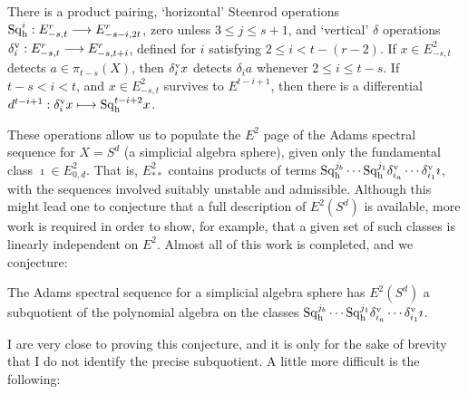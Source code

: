 \documentclass[11pt]{article}
\newcommand{\Sq}{\mathrm{Sq}}
\begin{document}
\begin{thm*}\label{adamsOperationsOmnibus}
There is a product pairing, `horizontal' Steenrod operations $\Sq^i_\textup{h}:E^r_{-s,t}\to E^r_{-s-i,2t}$, zero unless $3\leq j\leq s+1$, and `vertical' $\delta$ operations $\delta_i^\textup{v}:E^r_{-s,t}\to E^r_{-s,t+i}$, defined for $i$ satisfying $2\leq i<t-(r-2)$. If $x\in E^2_{-s,t}$ detects $a\in\pi_{t-s}(X)$, then $\delta_i^\textup{v}x$ detects $\delta_ia$ whenever $2\leq i\leq t-s$. If $t-s<i<t$, and $x\in E^2_{-s,t}$ survives to $E^{t-i+1}$, then there is a differential $d^{t-i+1}:\delta_i^\textup{v}x\mapsto \Sq_\textup{h}^{t-i+2}x$.
\end{thm*}
These operations allow us to populate the $E^2$ page of the Adams spectral sequence for $X=S^d$ (a simplicial algebra sphere), given only the fundamental class $\imath\in E^2_{0,d}$. That is, $E^2_{**}$ contains products of terms $\Sq^{j_b}_\textup{h}\cdots \Sq^{j_1}_\textup{h}\delta_{i_a}^\textup{v}\cdots \delta_{i_1}^\textup{v}\imath$, with the sequences involved suitably unstable and admissible. Although this might lead one to conjecture that a full description of $E^2(S^d)$ is available, more work is required in order to show, for example, that a given set of such classes is linearly independent on $E^2$. Almost all of this work is completed, and we conjecture:
\begin{conjecture}
The Adams spectral sequence for a simplicial algebra sphere has $E^2(S^d)$ a subquotient of the polynomial algebra on the classes $\Sq^{j_b}_\textup{h}\cdots \Sq^{j_1}_\textup{h}\delta_{i_a}^\textup{v}\cdots \delta_{i_1}^\textup{v}\imath$.
\end{conjecture}
I are very close to proving this conjecture, and it is only for the sake of brevity that I do not identify the precise subquotient. A little more difficult is the following:
\end{document}
